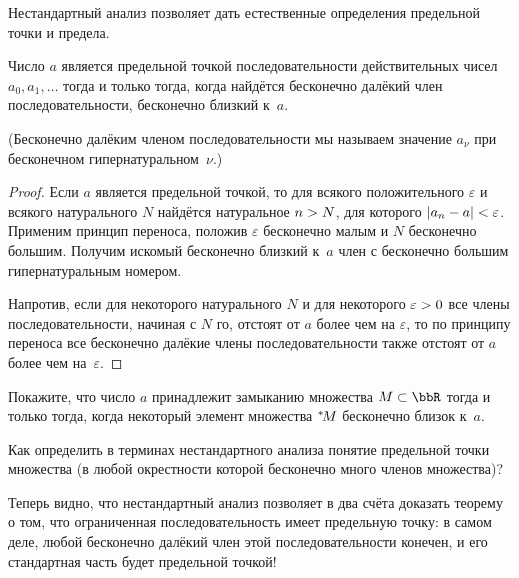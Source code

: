 Нестандартный анализ позволяет дать естественные определения
предельной точки и предела.

\begin{theorem}
Число $a$ является предельной точкой%
%
последовательности действительных чисел
$a_0,a_1,\dots$ тогда и только тогда, когда найдётся
бесконечно далёкий член последовательности, бесконечно
близкий к~$a$.
\end{theorem}

(Бесконечно далёким членом последовательности мы называем значение $a_\nu$
при бесконечном гипернатуральном~$\nu$.)

\begin{proof}
Если $a$ является предельной точкой, то для всякого положительного
$\varepsilon$ и всякого натурального $N$
найдётся натуральное $n\hm>N$, для которого $|a_n-a|\hm<\varepsilon$.
Применим принцип переноса, положив $\varepsilon$ бесконечно малым
и $N$ бесконечно большим. Получим искомый бесконечно близкий к~$a$
член с бесконечно большим гипернатуральным номером.

Напротив, если для некоторого натурального $N$ и для некоторого
$\varepsilon\hm>0$ все члены последовательности, начиная с $N$\д
го, отстоят от $a$ более чем на $\varepsilon$, то по принципу
переноса все бесконечно далёкие члены последовательности также
отстоят от $a$ более чем на~$\varepsilon$.
\end{proof}

\begin{problem}
Покажите, что число $a$ принадлежит замыканию множества%
%
$M\hm\subset\bbR$ тогда и только тогда, когда некоторый элемент
множества ${}^*\!M$ бесконечно близок к~$a$.
\end{problem}

\begin{problem}
Как определить в терминах нестандартного анализа понятие
предельной точки множества%
%
(в любой окрестности которой
бесконечно много членов множества)?
\end{problem}

Теперь видно, что нестандартный анализ позволяет в два счёта
доказать теорему о том, что ограниченная
последовательность имеет предельную точку: в самом деле, любой
бесконечно далёкий член этой последовательности конечен, и его
стандартная часть будет предельной точкой!


